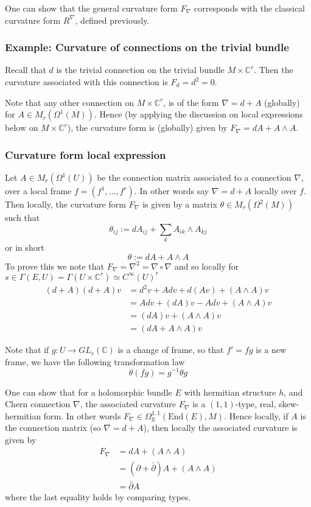\documentclass[a4paper]{article}
\theoremstyle{definition} \newtheorem*{definition}{Definition}
\theoremstyle{definition} \newtheorem*{definitions}{Definitions}
\theoremstyle{plain} \newtheorem{theorem}{Theorem}[section]
\theoremstyle{plain} \newtheorem{proposition}[theorem]{Proposition}
\theoremstyle{plain} \newtheorem{corollary}[theorem]{Corollary}
\theoremstyle{plain} \newtheorem{lemma}[theorem]{Lemma}
\theoremstyle{plain} \newtheorem{example}[theorem]{Example}
\newcommand{\realnos}{\mathbb{R}}
\newcommand{\complexnos}{\mathbb{C}}
\newcommand{\End}{\text{End}}
\newcommand{\smooth}{C^\infty}
\begin{document}
One can show that the general curvature form $F_\nabla$ corresponds with the classical curvature form $R^\nabla$, defined previously.

\subsubsection{Example: Curvature of connections on the trivial bundle}
Recall that $d$ is the trivial connection on the trivial bundle $M\times \complexnos^r$. Then the curvature associated with this connection is
$F_d = d^2 = 0$.

Note that any other connection on $M\times \complexnos^r$, is of the form $\nabla = d+A$ (globally) for $A\in M_r(\Omega^1(M))$. Hence (by applying the discussion on local expressions below on $M\times \complexnos^r$), the curvature form is (globally) given by $F_\nabla = dA+A\wedge A$. 

\subsubsection{Curvature form local expression}
Let $A\in M_r(\Omega^1(U))$ be the connection matrix associated to a connection $\nabla$, over a local frame $f=(f^1, \ldots , f^r)$. In other words say $\nabla=d+A$ locally over $f$. Then locally, the curvature form $F_\nabla$ is given by a matrix $\theta \in M_r(\Omega^2(M))$ such that
$$\mathbb{\theta}_{ij} := dA_{ij} + \sum_k A_{ik}\wedge A_{kj}$$
or in short
$$\mathbb{\theta} := dA + A\wedge A$$
To prove this we note that $F_\nabla = \nabla^2 = \nabla \circ \nabla$ and so locally for $s\in \Gamma(E, U)=\Gamma(U\times \complexnos^r)\simeq \smooth(U)^r$
\begin{align*}
    (d+A)(d+A)v & = d^2 v + A dv + d(Av) + (A\wedge A) v \\
    & = A dv + (dA) v - A  dv + (A\wedge A) v \\
    & = (dA) v  + (A\wedge A) v \\
    & = (dA + A\wedge A) v
\end{align*}

Note that if $g:U\to GL_r(\complexnos)$ is a change of frame, so that $f'=fg$ is a new frame, we have the following transformation law
$$\mathfrak{\theta}(fg)=g^{-1} \mathbb{\theta}g$$

One can show that for a holomorphic bundle $E$ with hermitian structure $h$, and Chern connection $\nabla$, the associated curvature $F_\nabla$ is a $(1,1)$-type, real, skew-hermitian form. In other words $F_\nabla\in \Omega^{1,1}_\realnos (\End(E), M)$. Hence locally, if $A$ is the connection matrix (so $\nabla = d+A$), then locally the associated curvature is given by
\begin{align*}
F_\nabla & = dA + (A\wedge A) \\
& = (\partial + \bar{\partial})A + (A\wedge A) \\
& = \bar{\partial} A
\end{align*}
where the last equality holds by comparing types.
\end{document}
